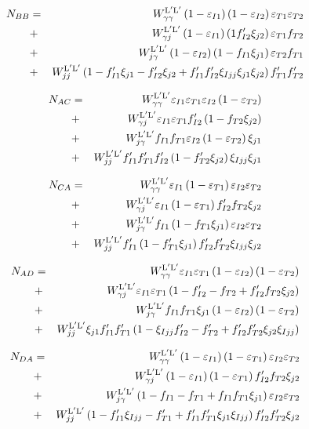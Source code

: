  \begin{eqnarray}
    N_{BB} &=& \WyyLL \left(1-\eIone\right)\left(1-\eItwo\right)\eTone \eTtwo  \nonumber \\
    &+& \WyjLL \left(1-\eIone\right)\left(1 \fIptwo \xijtwo\right)\eTone \fTtwo    \nonumber \\
    &+& \WjyLL\left(1-\eItwo\right)\left(1-\fIone \xijone\right)\eTtwo \fTone    \nonumber \\
    &+& \WjjLL\left(1-\fIpone\xijone-\fIptwo\xijtwo+\fIpone\fIptwo\xiIjj \xijone\xijtwo\right)\fTpone\fTptwo
  \end{eqnarray}
  
  \begin{eqnarray}
    N_{AC} &=& \WyyLL  \eIone \eTone \eItwo\left(1-  \eTtwo\right) \nonumber \\
    &+& \WyjLL\eIone \eTone \fIptwo    \left(1-\fTtwo \xijtwo  \right) \nonumber \\
    &+& \WjyLL \fIone \fTone \eItwo  \left(1-\eTtwo   \right)\xijone \nonumber \\
    &+& \WjjLL\fIpone\fTpone \fIptwo\left(1- \fTptwo\xijtwo\right)\xiIjj \xijone
  \end{eqnarray}
  
  \begin{eqnarray}
    N_{CA} &=& \WyyLL \eIone \left(1-\eTone\right) \eItwo \eTtwo \nonumber \\
    &+& \WyjLL\eIone \left(1-\eTone   \right)\fIptwo \fTtwo   \xijtwo  \nonumber \\
    &+& \WjyLL \fIone  \left(1-\fTone \xijone  \right) \eItwo \eTtwo\nonumber \\
    &+& \WjjLL\fIpone\left(1-\fTpone\xijone\right)\fIptwo \fTptwo\xiIjj\xijtwo
  \end{eqnarray}
  
  \begin{eqnarray}
    N_{AD} &=& \WyyLL \eIone \eTone \left(1-\eItwo\right)\left(1-\eTtwo\right) \nonumber \\
    &+& \WyjLL\eIone \eTone  \left(1-\fIptwo  -\fTtwo  +\fIptwo\fTtwo   \xijtwo  \right)\nonumber \\
    &+& \WjyLL \fIone \fTone \xijone \left(1-\eItwo\right)\left(1-\eTtwo\right) \nonumber \\
    &+& \WjjLL\xijone\fIpone \fTpone \left(1-\xiIjj\fIptwo- \fTptwo+\fIptwo \fTptwo\xijtwo\xiIjj\right)
  \end{eqnarray}
  
  \begin{eqnarray}
    N_{DA} &=& \WyyLL \left(1- \eIone\right)\left(1-\eTone\right)\eItwo \eTtwo \nonumber \\
    &+& \WyjLL  \left(1-\eIone\right)\left(1-\eTone\right)\fIptwo \fTtwo\xijtwo \nonumber \\
    &+& \WjyLL  \left(1-\fIone-\fTone  +\fIone \fTone  \xijone  \right) \eItwo \eTtwo\nonumber \\
    &+& \WjjLL\left(1- \fIpone\xiIjj-\fTpone+ \fIpone\fTpone\xijone\xiIjj\right)\fIptwo \fTptwo\xijtwo
  \end{eqnarray}
  
